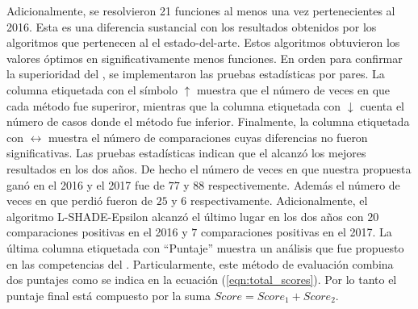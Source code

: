 %
Adicionalmente, se resolvieron 21 funciones al menos una vez pertenecientes al \CEC{} 2016.
%
Esta es una diferencia sustancial con los resultados obtenidos por los algoritmos que pertenecen al el estado-del-arte.
%
Estos algoritmos obtuvieron los valores óptimos en significativamente menos funciones.
%
En orden para confirmar la superioridad del \DEEDM{}, se implementaron las pruebas estadísticas por pares.
%
La columna etiquetada con el símbolo $\uparrow$ muestra que el número de veces en que cada método fue superiror, mientras que la columna etiquetada con $\downarrow$ cuenta el número de casos donde el método fue inferior.
%
Finalmente, la columna etiquetada con $\longleftrightarrow$ muestra el número de comparaciones cuyas diferencias no fueron significativas.
%
Las pruebas estadísticas indican que el \DEEDM{} alcanzó los mejores resultados en los dos años.
%
De hecho el número de veces en que nuestra propuesta ganó en el \CEC{} 2016 y el \CEC{} 2017 fue de $77$ y $88$ respectivemente.
%
Además el número de veces en que perdió fueron de $25$ y $6$ respectivamente.
%
Adicionalmente, el algoritmo L-SHADE-Epsilon alcanzó el último lugar en los dos años con $20$ comparaciones positivas en el 2016 y $7$ comparaciones positivas en el 2017.
%
%
La última columna etiquetada con ``Puntaje'' muestra un análisis que fue propuesto en las competencias del \CEC{}.
%
Particularmente, este método de evaluación combina dos puntajes como se indica en la ecuación (\ref{eqn:total_scores}).
%
%
Por lo tanto el puntaje final está compuesto por la suma $Score = Score_1 + Score_2$.

